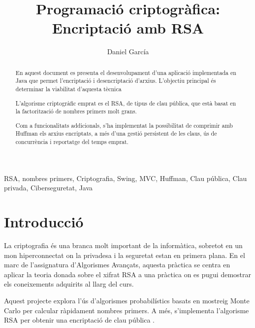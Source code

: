 \documentclass{ieeetj}
\begin{document}

\title{Programació criptogràfica: \newline Encriptació amb RSA}

\author{Daniel García}  



\begin{abstract}

En aquest document es presenta el desenvolupament d'una aplicació implementada en Java que permet l'encriptació i desencriptació d'arxius. L'objectiu principal és determinar la viabilitat d'aquesta tècnica

L'algorisme criptogràfic emprat es el RSA, de tipus de clau pública, que està basat en la factorització de nombres primers molt grans.

Com a funcionalitats addicionals, s'ha implementat la possibilitat de comprimir amb Huffman els arxius encriptats, a més d'una gestió persistent de les claus, ús de concurrència i reportatge del temps emprat. 

\end{abstract}

\begin{IEEEkeywords}
RSA, nombres primers, Criptografia, Swing, MVC, Huffman, Clau pública, Clau privada, Ciberseguretat, Java 
\end{IEEEkeywords}


\maketitle
\section{Introducció}
La criptografia és una branca molt important de la informàtica, sobretot en un mon hiperconnectat on la privadesa i la seguretat estan en primera plana.  \newline
En el marc de l’assignatura d’Algorismes Avançats, aquesta pràctica se centra en aplicar la teoria donada sobre el xifrat RSA a una pràctica on es pugui demostrar els coneixements adquirits al llarg del curs.\newline

Aquest projecte explora l’ús d’algorismes probabilístics basats en mostreig Monte Carlo\cite{hammersley1964} per calcular ràpidament nombres primers. \newline
A més, s’implementa l'algorisme RSA per obtenir una encriptació de clau pública .\newline
\end{document}
